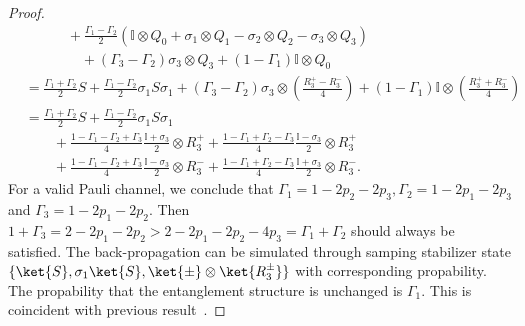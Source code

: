 \documentclass[aps,%
twocolumn,%
floatfix,%
pra,%
amsfonts,%
longbibliography,%
groupedaddress,%
superscriptaddress]{revtex4-2}%
\newcommand{\1}{\mathbbm{1}}
\begin{document}
\begin{proof}
\begin{align}
     &\quad\quad \quad +\frac{\Gamma_1- \Gamma_2}{2} \left( \mathbb{I} \otimes Q_0 + \sigma_1\otimes Q_1 - \sigma_2\otimes Q_2 - \sigma_3\otimes Q_3\right)\\
   & \quad \quad \quad \quad  +(\Gamma_3 - \Gamma_2)\sigma_3 \otimes Q_3 + (1 - \Gamma_1)\mathbb{I} \otimes Q_0\\
    &= \frac{\Gamma_1+ \Gamma_2}{2}  S + \frac{\Gamma_1- \Gamma_2}{2} \sigma_1 S \sigma_1 + (\Gamma_3 - \Gamma_2)\sigma_3 \otimes(\frac{R_3^+ - R_3^-}{4})  + (1- \Gamma_1)\mathbb{I} \otimes (\frac{R_3^+ + R_3^-}{4}) \\
    &= \frac{\Gamma_1+ \Gamma_2}{2}  S + \frac{\Gamma_1- \Gamma_2}{2} \sigma_1 S \sigma_1 \\
    &\quad \quad + \frac{ 1 - \Gamma_1- \Gamma_2+\Gamma_3 }{4}\frac{\mathbb{I} + \sigma_3 }{2} \otimes {R_3^+}+\frac{1 - \Gamma_1 + \Gamma_2-\Gamma_3}{4}\frac{\mathbb{I}-\sigma_3}{2} \otimes {R_3^+}\\
    &\quad \quad + \frac{ 1 - \Gamma_1- \Gamma_2+\Gamma_3 }{4}\frac{\mathbb{I} - \sigma_3 }{2} \otimes {R_3^-}+\frac{1 - \Gamma_1 + \Gamma_2-\Gamma_3}{4}\frac{\mathbb{I}+\sigma_3}{2} \otimes {R_3^-}.
\end{align}
For a valid Pauli channel, we conclude that $\Gamma_1 = 1 - 2p_2 - 2p_3,\Gamma_2 = 1 - 2p_1 - 2p_3$ and $\Gamma_3 = 1 - 2p_1 - 2p_2$. Then $1 + \Gamma_3 = 2 - 2p_1 - 2p_2 >2 - 2p_1 - 2p_2 - 4p_3 = \Gamma_1 + \Gamma_2$ should always be satisfied. The back-propagation can be simulated through samping stabilizer state $\{\ket{S}, \sigma_1 \ket{S}, \ket{\pm} \otimes \ket{R_3^{\pm}}\}$ with corresponding propability. The propability that the entanglement structure is unchanged is $\Gamma_1$. This is coincident with previous result~\cite{rajakumar2025polynomial}.


\end{proof}
\end{document}
